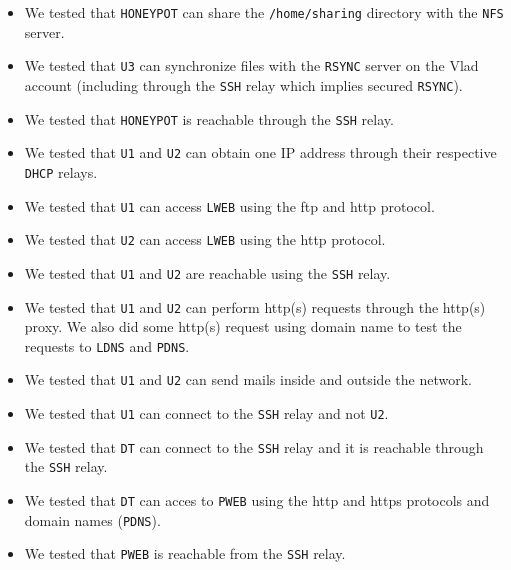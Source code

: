 \documentclass[a4paper, 11pt, oneside]{article}
\begin{document}
\begin{itemize}
    \item We tested that \texttt{HONEYPOT} can share the \texttt{/home/sharing} directory with the \texttt{NFS} server.
    \item We tested that \texttt{U3} can synchronize files with the \texttt{RSYNC} server on the Vlad account (including through the \texttt{SSH} relay which implies secured \texttt{RSYNC}).
    \item We tested that \texttt{HONEYPOT} is reachable through the \texttt{SSH} relay.
    \item We tested that \texttt{U1} and \texttt{U2} can obtain one IP address through their respective \texttt{DHCP} relays.
    \item We tested that \texttt{U1} can access \texttt{LWEB} using the ftp and http protocol.
    \item We tested that \texttt{U2} can access \texttt{LWEB} using the http protocol.
    \item We tested that \texttt{U1} and \texttt{U2} are reachable using the \texttt{SSH} relay.
    \item We tested that \texttt{U1} and \texttt{U2} can perform http(s) requests through the http(s) proxy. We also did some http(s) request using domain name to test the requests to \texttt{LDNS} and \texttt{PDNS}.
    \item We tested that \texttt{U1} and \texttt{U2} can send mails inside and outside the network.
    \item We tested that \texttt{U1} can connect to the \texttt{SSH} relay and not \texttt{U2}.
    \item We tested that \texttt{DT} can connect to the \texttt{SSH} relay and it is reachable through the \texttt{SSH} relay.
    \item We tested that \texttt{DT} can acces to \texttt{PWEB} using the http and https protocols and domain names (\texttt{PDNS}).
    \item We tested that \texttt{PWEB} is reachable from the \texttt{SSH} relay.
\end{itemize}
\end{document}
